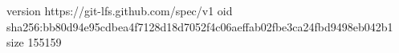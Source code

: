 version https://git-lfs.github.com/spec/v1
oid sha256:bb80d94e95cdbea4f7128d18d7052f4c06aeffab02fbe3ca24fbd9498eb042b1
size 155159
